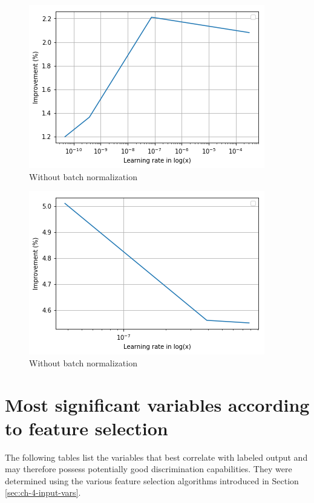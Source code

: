 \begin{figure}[h]
    \centering
    \includegraphics[width=.65\textwidth]{assets/appendix/plot_group1.png}
    \caption{Without batch normalization}
    \label{fig:ch_5_plot1}
\end{figure}
\begin{figure}[h]
    \centering
    \includegraphics[width=.65\textwidth]{assets/appendix/plot_group5.png}
    \caption{Without batch normalization}
    \label{fig:ch_5_plot5}
\end{figure}

\chapter{Most significant variables according to feature selection}
\label{ch:appendix_c}
The following tables list the variables that best correlate with labeled output and may therefore possess potentially good discrimination capabilities. They were determined using the various feature selection algorithms introduced in Section \ref{sec:ch-4-input-vars}.


